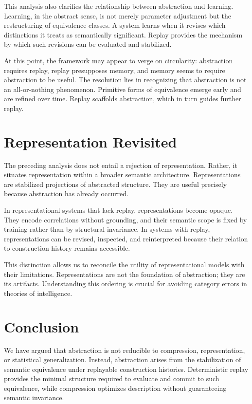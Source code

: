 \documentclass[11pt]{article}
\begin{document}
This analysis also clarifies the relationship between abstraction and learning. Learning, in the abstract sense, is not merely parameter adjustment but the restructuring of equivalence classes. A system learns when it revises which distinctions it treats as semantically significant. Replay provides the mechanism by which such revisions can be evaluated and stabilized.

At this point, the framework may appear to verge on circularity: abstraction requires replay, replay presupposes memory, and memory seems to require abstraction to be useful. The resolution lies in recognizing that abstraction is not an all-or-nothing phenomenon. Primitive forms of equivalence emerge early and are refined over time. Replay scaffolds abstraction, which in turn guides further replay.

\section{Representation Revisited}

The preceding analysis does not entail a rejection of representation. Rather, it situates representation within a broader semantic architecture. Representations are stabilized projections of abstracted structure. They are useful precisely because abstraction has already occurred.

In representational systems that lack replay, representations become opaque. They encode correlations without grounding, and their semantic scope is fixed by training rather than by structural invariance. In systems with replay, representations can be revised, inspected, and reinterpreted because their relation to construction history remains accessible.

This distinction allows us to reconcile the utility of representational models with their limitations. Representations are not the foundation of abstraction; they are its artifacts. Understanding this ordering is crucial for avoiding category errors in theories of intelligence.

\section{Conclusion}

We have argued that abstraction is not reducible to compression, representation, or statistical generalization. Instead, abstraction arises from the stabilization of semantic equivalence under replayable construction histories. Deterministic replay provides the minimal structure required to evaluate and commit to such equivalence, while compression optimizes description without guaranteeing semantic invariance.
\end{document}

